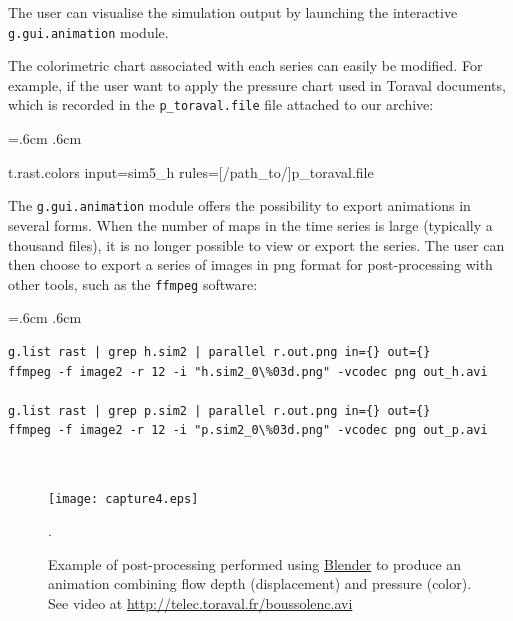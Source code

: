 \documentclass[12pt,oneside]{paper}
\newenvironment{code}{%
\vspace{2mm}%
\hangindent=.6cm%
\parindent.6cm%
\ttfamily%
\color{gris.3}%
}{
\vspace{2mm}%
}
\begin{document}
The user can visualise the simulation output by launching the interactive \texttt{g.gui.animation} module.

The colorimetric chart associated with each series can easily be modified. For example, if the user want to apply the pressure chart used in Toraval documents, which is recorded in the \texttt{p\_toraval.file} file attached to our archive:

\begin{code}
t.rast.colors input=sim5\_h rules=[/path\_to/]p\_toraval.file
\end{code}


The \texttt{g.gui.animation} module offers the possibility to export animations in several forms. When the number of maps in the time series is large (typically a thousand files), it is no longer possible to view or export the series. The user can then choose to export a series of images in png format for post-processing with other tools, such as the \verb+ffmpeg+ software:

\french
\begin{code}
\begin{Verbatim}
g.list rast | grep h.sim2 | parallel r.out.png in={} out={}
ffmpeg -f image2 -r 12 -i "h.sim2_0\%03d.png" -vcodec png out_h.avi

g.list rast | grep p.sim2 | parallel r.out.png in={} out={}
ffmpeg -f image2 -r 12 -i "p.sim2_0\%03d.png" -vcodec png out_p.avi
\end{Verbatim}
\end{code}
\english


\newpage

~\vfill

\begin{figure}[!h]
\begin{center}
\texttt{[image: capture4.eps]}
\caption{Example of post-processing performed using \href{https://www.blender.org/}{Blender} to produce an animation combining flow depth (displacement) and pressure (color). See video at \href{http://telec.toraval.fr/boussolenc.avi}{http://telec.toraval.fr/boussolenc.avi}}.
\label{fig:blend}
\end{center}
\end{figure}

~\vfill
\end{document}
